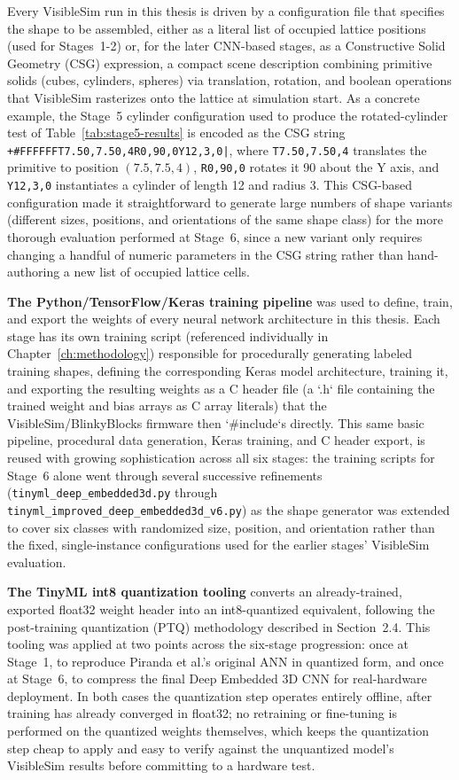 \documentclass[12pt,a4paper]{report}
\begin{document}
Every VisibleSim run in this thesis is driven by a configuration file that specifies the shape to be assembled, either as a literal list of occupied lattice positions (used for Stages~1-2) or, for the later CNN-based stages, as a Constructive Solid Geometry (CSG) expression, a compact scene description combining primitive solids (cubes, cylinders, spheres) via translation, rotation, and boolean operations that VisibleSim rasterizes onto the lattice at simulation start. As a concrete example, the Stage~5 cylinder configuration used to produce the rotated-cylinder test of Table~\ref{tab:stage5-results} is encoded as the CSG string \texttt{+\#FFFFFFT7.50,7.50,4R0,90,0Y12,3,0|}, where \texttt{T7.50,7.50,4} translates the primitive to position $(7.5, 7.5, 4)$, \texttt{R0,90,0} rotates it 90\textdegree{} about the Y axis, and \texttt{Y12,3,0} instantiates a cylinder of length 12 and radius 3. This CSG-based configuration made it straightforward to generate large numbers of shape variants (different sizes, positions, and orientations of the same shape class) for the more thorough evaluation performed at Stage~6, since a new variant only requires changing a handful of numeric parameters in the CSG string rather than hand-authoring a new list of occupied lattice cells.

\textbf{The Python/TensorFlow/Keras training pipeline} was used to define, train, and export the weights of every neural network architecture in this thesis. Each stage has its own training script (referenced individually in Chapter~\ref{ch:methodology}) responsible for procedurally generating labeled training shapes, defining the corresponding Keras model architecture, training it, and exporting the resulting weights as a C header file (a `.h` file containing the trained weight and bias arrays as C array literals) that the VisibleSim/BlinkyBlocks firmware then `\#include`s directly. This same basic pipeline, procedural data generation, Keras training, and C header export, is reused with growing sophistication across all six stages: the training scripts for Stage~6 alone went through several successive refinements (\texttt{tinyml\_deep\_embedded3d.py} through \texttt{tinyml\_improved\_deep\_embedded3d\_v6.py}) as the shape generator was extended to cover six classes with randomized size, position, and orientation rather than the fixed, single-instance configurations used for the earlier stages' VisibleSim evaluation.

\textbf{The TinyML int8 quantization tooling} converts an already-trained, exported float32 weight header into an int8-quantized equivalent, following the post-training quantization (PTQ) methodology described in Section~2.4. This tooling was applied at two points across the six-stage progression: once at Stage~1, to reproduce Piranda et al.'s original ANN in quantized form, and once at Stage~6, to compress the final Deep Embedded 3D CNN for real-hardware deployment. In both cases the quantization step operates entirely offline, after training has already converged in float32; no retraining or fine-tuning is performed on the quantized weights themselves, which keeps the quantization step cheap to apply and easy to verify against the unquantized model's VisibleSim results before committing to a hardware test.
\end{document}
